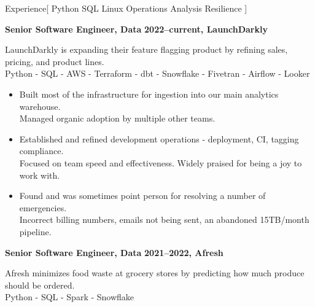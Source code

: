 \documentclass[11pt,a4paper]{article}
\begin{document}
\sloppy  %


\vspace{1em}

\begin{mysection}{Experience}[
    Python
    \textbullet{} SQL
    \textbullet{} Linux
    \textbullet{} Operations
    \textbullet{} Analysis
    \textbullet{} Resilience
]

  \begin{addmargin}[0.5em]{0em}
    {\large\bfseries Senior Software Engineer, Data}%
    \hfill {\bfseries 2022--current, LaunchDarkly}%
    \begin{adjustwidth}{1ex}{0ex}
      LaunchDarkly is expanding their feature flagging product by
      refining sales, pricing, and product lines.\\
      Python - SQL - AWS - Terraform - dbt - Snowflake - Fivetran - Airflow
      - Looker

      \begin{itemize}
          [label=-, topsep=0pt, itemsep=0.5ex, parsep=0pt, leftmargin=1em]

      \item Built most of the infrastructure for ingestion into our main
            analytics warehouse.
      \\    Managed organic adoption by multiple other teams.

      \item Established and refined development operations - deployment, CI,
            tagging compliance.
      \\    Focused on team speed and effectiveness.
            Widely praised for being a joy to work with.

      \item Found and was sometimes point person for resolving a number of
            emergencies.
      \\    Incorrect billing numbers, emails not being sent,
            an abandoned 15TB/month pipeline.

      \end{itemize}

    \end{adjustwidth}
  \end{addmargin}
  \medskip


  \begin{addmargin}[0.5em]{0em}
    {\large\bfseries Senior Software Engineer, Data}%
    \hfill {\bfseries 2021--2022, Afresh}%
    \begin{adjustwidth}{1ex}{0ex}
      Afresh minimizes food waste at grocery stores by predicting how much
      produce should be ordered.\\
      Python - SQL - Spark - Snowflake


\end{adjustwidth}
\end{addmargin}
\end{mysection}
\end{document}
